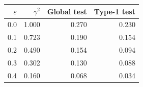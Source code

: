 \begin{tabular}{rrrr}
\toprule
$\varepsilon$ & $\gamma^2$ & Global test & Type-1 test \\
\midrule
0.0 & 1.000 & 0.270 & 0.230 \\
0.1 & 0.723 & 0.190 & 0.154 \\
0.2 & 0.490 & 0.154 & 0.094 \\
0.3 & 0.302 & 0.130 & 0.088 \\
0.4 & 0.160 & 0.068 & 0.034 \\
\bottomrule
\end{tabular}
